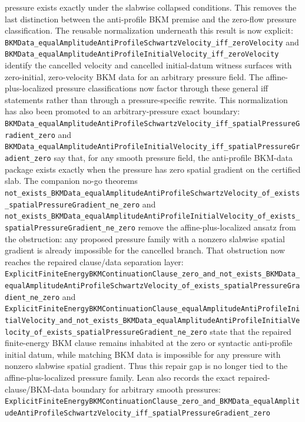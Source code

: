 \documentclass[11pt]{article}
\begin{document}
pressure exists exactly under the slabwise collapsed conditions.  This removes
the last distinction between the anti-profile BKM premise and the zero-flow
pressure classification.
The reusable normalization underneath this result is now explicit:
\texttt{BKMData\_equalAmplitudeAntiProfileSchwartzVelocity\_iff\_zeroVelocity}
and
\texttt{BKMData\_equalAmplitudeAntiProfileInitialVelocity\_iff\_zeroVelocity}
identify the cancelled velocity and cancelled initial-datum witness surfaces
with zero-initial, zero-velocity BKM data for an arbitrary pressure field.
The affine-plus-localized pressure classifications now factor through these
general iff statements rather than through a pressure-specific rewrite.
This normalization has also been promoted to an arbitrary-pressure exact
boundary:
\texttt{BKMData\_equalAmplitudeAntiProfileSchwartzVelocity\_iff\_spatialPressureGradient\_zero}
and
\texttt{BKMData\_equalAmplitudeAntiProfileInitialVelocity\_iff\_spatialPressureGradient\_zero}
say that, for any smooth pressure field, the anti-profile BKM-data package
exists exactly when the pressure has zero spatial gradient on the certified
slab.  The companion no-go theorems
\texttt{not\_exists\_BKMData\_equalAmplitudeAntiProfileSchwartzVelocity\_of\_exists\_spatialPressureGradient\_ne\_zero}
and
\texttt{not\_exists\_BKMData\_equalAmplitudeAntiProfileInitialVelocity\_of\_exists\_spatialPressureGradient\_ne\_zero}
remove the affine-plus-localized ansatz from the obstruction: any proposed
pressure family with a nonzero slabwise spatial gradient is already impossible
for the cancelled branch.
That obstruction now reaches the repaired clause/data separation layer:
\texttt{ExplicitFiniteEnergyBKMContinuationClause\_zero\_and\_not\_exists\_BKMData\_equalAmplitudeAntiProfileSchwartzVelocity\_of\_exists\_spatialPressureGradient\_ne\_zero}
and
\texttt{ExplicitFiniteEnergyBKMContinuationClause\_equalAmplitudeAntiProfileInitialVelocity\_and\_not\_exists\_BKMData\_equalAmplitudeAntiProfileInitialVelocity\_of\_exists\_spatialPressureGradient\_ne\_zero}
state that the repaired finite-energy BKM clause remains inhabited at the
zero or syntactic anti-profile initial datum, while matching BKM data is
impossible for any pressure with nonzero slabwise spatial gradient.  Thus this
repair gap is no longer tied to the affine-plus-localized pressure family.
Lean also records the exact repaired-clause/BKM-data boundary for arbitrary
smooth pressures:
\texttt{ExplicitFiniteEnergyBKMContinuationClause\_zero\_and\_BKMData\_equalAmplitudeAntiProfileSchwartzVelocity\_iff\_spatialPressureGradient\_zero}
\end{document}
